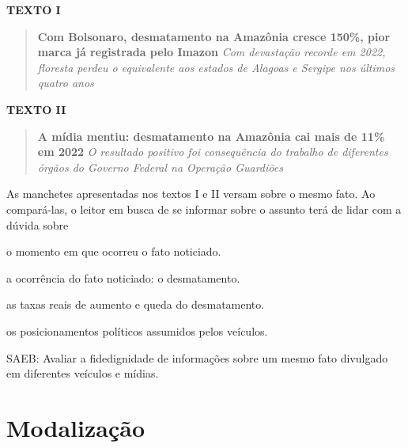 \textbf{TEXTO I}

\begin{quote}
\textbf{Com Bolsonaro, desmatamento na Amazônia cresce 150\%, pior marca
já registrada pelo Imazon} \emph{Com devastação recorde em 2022,
floresta perdeu o equivalente aos estados de Alagoas e Sergipe nos
últimos quatro anos}
\end{quote}


\textbf{TEXTO II}

\begin{quote}
\textbf{A mídia mentiu: desmatamento na Amazônia cai mais de 11\% em
2022} \emph{O resultado positivo foi consequência do trabalho de
diferentes órgãos do Governo Federal na Operação Guardiões}
\end{quote}


As manchetes apresentadas nos textos I e II versam sobre o mesmo fato.
Ao compará-las, o leitor em busca de se informar sobre o assunto terá de
lidar com a dúvida sobre

\begin{escolha}
\item o momento em que ocorreu o fato noticiado.

\item a ocorrência do fato noticiado: o desmatamento.

\item as taxas reais de aumento e queda do desmatamento.

\item os posicionamentos políticos assumidos pelos veículos.
\end{escolha}

SAEB: Avaliar a fidedignidade de informações sobre um mesmo fato
divulgado em diferentes veículos e mídias.

\chapter{Modalização}

